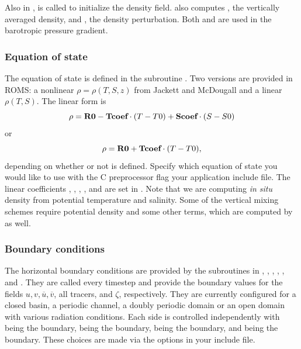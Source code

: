 Also in ,  is called to initialize
the density field.  also computes ,
the vertically averaged density, and , the density
perturbation. Both  and  are used in the barotropic
pressure gradient.


\subsubsection{Equation of state}
The equation of state is defined in the subroutine .  Two
versions are provided in ROMS: a nonlinear $\rho =
\rho(T,S,z)$ from Jackett and McDougall \cite{Jackett} and a linear
$\rho(T,S)$.  The linear form is
$$
      \rho = \mbox{\bf R0} - \mbox{\bf Tcoef} \cdot (T-T0) +
      \mbox{\bf Scoef} \cdot (S-S0)
$$
or
$$
     \rho = \mbox{\bf R0} + \mbox{\bf Tcoef} \cdot (T-T0),
$$
depending on whether or not
 is defined.  Specify which equation of state you
would like to use with the  C preprocessor flag your
application include file. The linear coefficients , ,
, , and  are set in . Note
that we are computing {\em in situ} density from potential temperature and
salinity. Some of the vertical mixing schemes require potential density
and some other terms, which are computed by  as well.

\subsubsection{Boundary conditions}
\label{Bcs}
The horizontal boundary conditions are provided by the subroutines
in , , , ,
, and .  They are called every timestep
and provide the boundary values for the fields $u, v, \overline{u},
\overline{v}$, all tracers, and $\zeta$, respectively. They are currently
configured for a closed basin, a periodic channel, a doubly periodic
domain or an open domain with various radiation conditions. Each side is
controlled independently with  being the  boundary,
 being the  boundary,  being the 
boundary, and  being the  boundary. These choices are
made via the  options in your include file.

